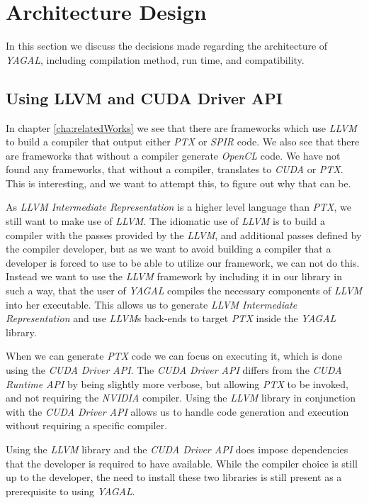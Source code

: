 \section{Architecture Design}
In this section we discuss the decisions made regarding the architecture of \textit{YAGAL}, including compilation method, run time, and compatibility.

\subsection{Using LLVM and CUDA Driver API}
In chapter \ref{cha:relatedWorks} we see that there are frameworks which use \textit{LLVM} to build a compiler that output either \textit{PTX} or \textit{SPIR} code. We also see that there are frameworks that without a compiler generate \textit{OpenCL} code. We have not found any frameworks, that without a compiler, translates to \textit{CUDA} or \textit{PTX}. This is interesting, and we want to attempt this, to figure out why that can be.

As \textit{LLVM Intermediate Representation} is a higher level language than \textit{PTX}, we still want to make use of \textit{LLVM}. The idiomatic use of \textit{LLVM} is to build a compiler with the passes provided by the \textit{LLVM}, and additional passes defined by the compiler developer, but as we want to avoid building a compiler that a developer is forced to use to be able to utilize our framework, we can not do this. Instead we want to use the \textit{LLVM} framework by including it in our library in such a way, that the user of \textit{YAGAL} compiles the necessary components of \textit{LLVM} into her executable. This allows us to generate \textit{LLVM Intermediate Representation} and use \textit{LLVM}s back-ends to target \textit{PTX} inside the \textit{YAGAL} library.

When we can generate \textit{PTX} code we can focus on executing it, which is done using the \textit{CUDA Driver API}. The \textit{CUDA Driver API} differs from the \textit{CUDA Runtime API} by being slightly more verbose, but allowing \textit{PTX} to be invoked, and not requiring the \textit{NVIDIA} compiler. Using the \textit{LLVM} library in conjunction with the \textit{CUDA Driver API} allows us to handle code generation and execution without requiring a specific compiler.

Using the \textit{LLVM} library and the \textit{CUDA Driver API} does impose dependencies that the developer is required to have available. While the compiler choice is still up to the developer, the need to install these two libraries is still present as a prerequisite to using \textit{YAGAL}.

